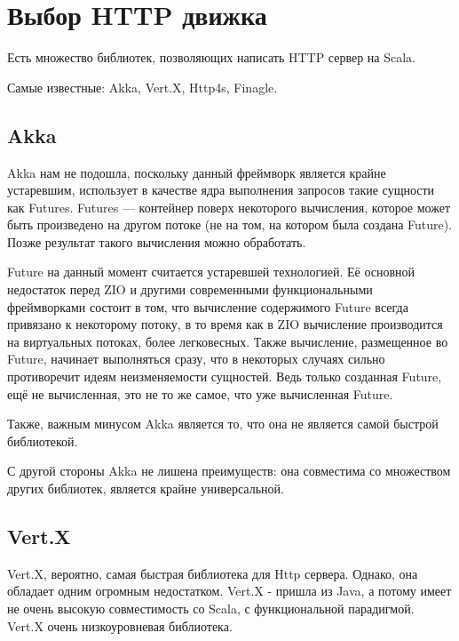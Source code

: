 \documentclass[14pt]{extarticle}
\begin{document}
    \section{Выбор HTTP движка}

    Есть множество библиотек, позволяющих написать HTTP сервер на Scala.

    Самые известные: Akka, Vert.X, Http4s, Finagle.


    \subsection{Akka}
    Akka нам не подошла, поскольку данный фреймворк является крайне устаревшим, использует в качестве ядра выполнения
    запросов такие сущности как Futures. Futures --- контейнер поверх некоторого вычисления, которое может быть
    произведено на другом потоке (не на том, на котором была создана Future). Позже результат такого вычисления можно
    обработать.

    Future на данный момент считается устаревшей технологией. Её основной недостаток перед ZIO и другими
    современными функциональными фреймворками состоит в том, что
    вычисление содержимого Future всегда привязано к некоторому потоку, в то время как в ZIO вычисление производится
    на виртуальных потоках, более легковесных. Также вычисление, размещенное во Future, начинает выполняться сразу,
    что в некоторых случаях сильно противоречит идеям неизменяемости сущностей. Ведь только созданная Future, ещё не
    вычисленная, это не то же самое, что уже вычисленная Future.

    Также, важным минусом Akka является то, что она не является самой быстрой библиотекой.

    С другой стороны Akka не лишена преимуществ: она совместима со множеством других библиотек, является крайне
    универсальной.

    \subsection{Vert.X}
    Vert.X, вероятно, самая быстрая библиотека для Http сервера. Однако, она обладает одним огромным недостатком. 
    Vert.X - пришла из Java, а потому имеет не очень высокую совместимость со Scala, с функциональной парадигмой. 
    Vert.X очень низкоуровневая библиотека.
    
\end{document}
